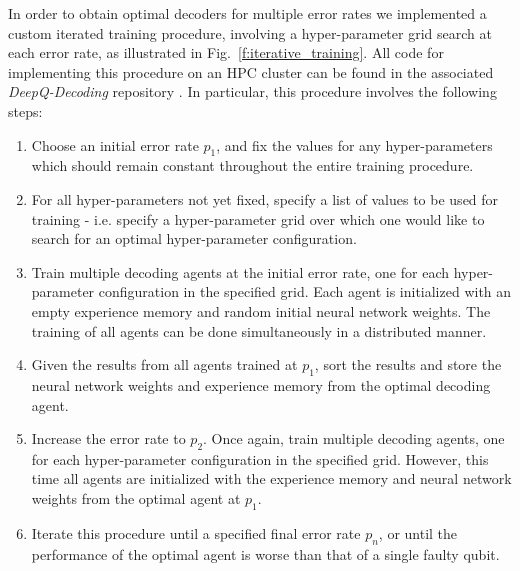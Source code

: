 \documentclass[twocolumn,preprintnumbers,amsmath,amssymb,notitlepage,nofootinbib,longbibliography,superscriptaddress,aps,pra,10pt]{revtex4-1}
\begin{document}
	In order to obtain optimal decoders for multiple error rates we implemented a custom iterated training procedure, involving a hyper-parameter grid search at each error rate, as illustrated in Fig.\ \ref{f:iterative_training}. All code for implementing this procedure on an HPC cluster can be found in the associated \emph{DeepQ-Decoding} repository \cite{DeepQDecoding}. In particular, this procedure involves the following steps:

	\begin{enumerate}
		\item Choose an initial error rate $p_1$, and fix the values for any hyper-parameters which should remain constant throughout the entire training procedure.
		\item For all hyper-parameters not yet fixed, specify a list of values to be used for training - i.e. specify a hyper-parameter grid over which one would like to search for an optimal hyper-parameter configuration.
		\item Train multiple decoding agents at the initial error rate, one for each hyper-parameter configuration in the specified grid. Each agent is initialized with an empty experience memory and random initial neural network weights. The training of all agents can be done simultaneously in a distributed manner.
		\item Given the results from all agents trained at $p_1$, sort the results and store the neural network weights and experience memory from the optimal decoding agent.
		\item Increase the error rate to $p_2$. Once again, train multiple decoding agents, one for each hyper-parameter configuration in the specified grid. However, this time all agents are initialized with the experience memory and neural network weights from the optimal agent at $p_1$.
		\item Iterate this procedure until a specified final error rate $p_n$, or until the performance of the optimal agent is worse than that of a single faulty qubit.
	\end{enumerate}
\end{document}

